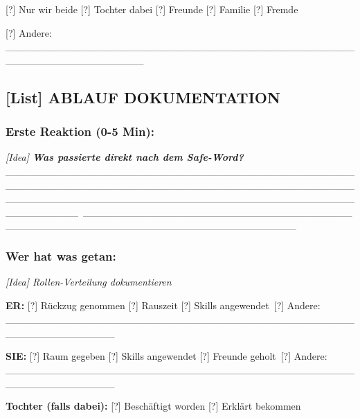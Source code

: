[?] Nur wir beide [?] Tochter dabei [?] Freunde [?] Familie [?] Fremde

[?] Andere: \_\_\_\_\_\_\_\_\_\_\_\_\_\_\_\_\_\_\_\_\_\_\_\_\_\_\_\_\_\_\_\_\_\_\_\_\_\_\_\_\_\_\_\_\_\_\_\_\_\_\_\_\_\_\_\_\_\_\_\_\_\_\_\_\_\_\_

\hypertarget{ablauf-dokumentation-1}{%
\subsection{\texorpdfstring{\textbf{[List] ABLAUF DOKUMENTATION}}{[List] ABLAUF DOKUMENTATION}}\label{ablauf-dokumentation-1}}

\hypertarget{erste-reaktion-0-5-min}{%
\subsubsection{\texorpdfstring{\textbf{Erste Reaktion (0-5 Min):}}{Erste Reaktion (0-5 Min):}}\label{erste-reaktion-0-5-min}}

\emph{[Idea] \textbf{Was passierte direkt nach dem Safe-Word?}} \_\_\_\_\_\_\_\_\_\_\_\_\_\_\_\_\_\_\_\_\_\_\_\_\_\_\_\_\_\_\_\_\_\_\_\_\_\_\_\_\_\_\_\_\_\_\_\_\_\_\_\_\_\_\_\_\_\_\_\_\_\_\_\_\_\_\_\_\_\_\_\_\_\_\_\_\_\_\_\_\_\_\_\_\_\_\_\_\_\_\_\_\_\_\_\_\_\_\_\_\_\_\_\_\_\_\_\_\_\_\_\_\_\_\_\_\_\_\_\_\_\_\_\_\_\_\_\_\_\_\_\_\_\_\_\_\_\_\_\_\_\_\_\_\_\_\_\_\_\_\_\_\_\_\
\_\_\_\_\_\_\_\_\_\_\_\_\_\_\_\_\_\_\_\_\_\_\_\_\_\_\_\_\_\_\_\_\_\_\_\_\_\_\_\_\_\_\_\_\_\_\_\_\_\_\_\_\_\_\_\_\_\_\_\_\_\_\_\_\_\_\_\_\_\_\_\_\_\_\_\_\_

\hypertarget{wer-hat-was-getan}{%
\subsubsection{\texorpdfstring{\textbf{Wer hat was getan:}}{Wer hat was getan:}}\label{wer-hat-was-getan}}

\emph{[Idea] Rollen-Verteilung dokumentieren}

\textbf{ER:} [?] Rückzug genommen [?] Rauszeit [?] Skills angewendet\
[?] Andere: \_\_\_\_\_\_\_\_\_\_\_\_\_\_\_\_\_\_\_\_\_\_\_\_\_\_\_\_\_\_\_\_\_\_\_\_\_\_\_\_\_\_\_\_\_\_\_\_\_\_\_\_\_\_\_\_\_\_\_\_\_\_\_

\textbf{SIE:} [?] Raum gegeben [?] Skills angewendet [?] Freunde geholt\
[?] Andere: \_\_\_\_\_\_\_\_\_\_\_\_\_\_\_\_\_\_\_\_\_\_\_\_\_\_\_\_\_\_\_\_\_\_\_\_\_\_\_\_\_\_\_\_\_\_\_\_\_\_\_\_\_\_\_\_\_\_\_\_\_\_\_

\textbf{Tochter (falls dabei):} [?] Beschäftigt worden [?] Erklärt bekommen

